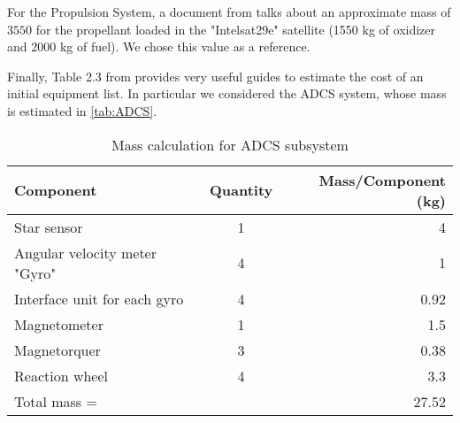 For the Propulsion System, a document from \cite{intelsat29e} talks about an approximate mass of $3550$ for the propellant loaded in the "Intelsat29e" satellite (1550 kg of oxidizer and 2000 kg of fuel). We chose this value as a reference.

Finally, Table 2.3 from \cite{Abdelal2013} provides very useful guides to estimate the cost of an initial equipment list. In particular we considered the ADCS system, whose mass is estimated in \autoref{tab:ADCS}.

\begin{table}[ht]
	\centering
	\begin{tabular}{lcr}
		\toprule
		Component & Quantity & Mass/Component (kg)\\
		\midrule
		Star sensor & 1 & 4\\
		Angular velocity meter "Gyro" & 4 & 1\\
		Interface unit for each gyro & 4 & 0.92\\
		Magnetometer & 1 & 1.5\\
		Magnetorquer & 3 & 0.38\\
		Reaction wheel & 4 & 3.3\\
		\midrule
		Total mass = & & 27.52\\
		\bottomrule
	\end{tabular}
	\caption{Mass calculation for ADCS subsystem}
	\label{tab:ADCS}
\end{table}

